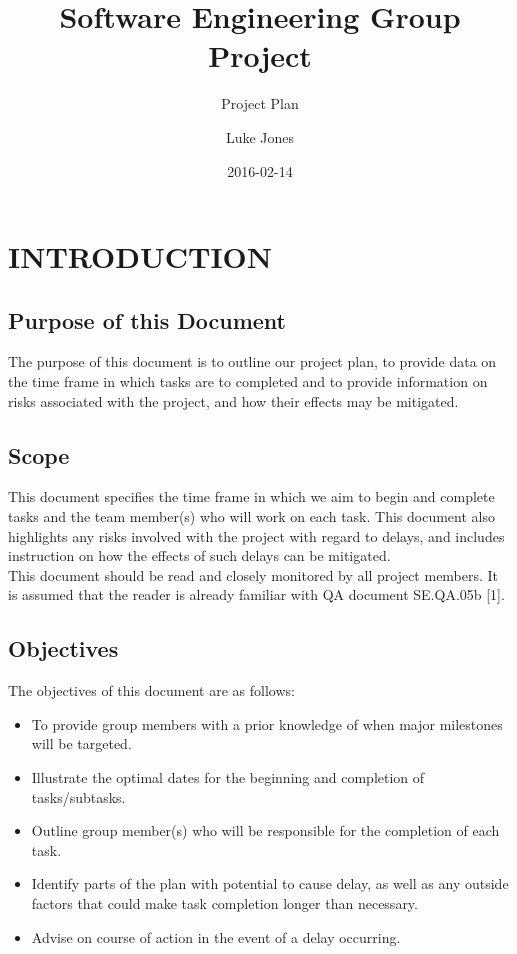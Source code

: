 \documentclass{project}
\begin{document}
\title{Software Engineering Group Project}
\subtitle{Project Plan}
\author{Luke Jones}     
\date{2016-02-14}
\maketitle
\tableofcontents
\newpage
\section{INTRODUCTION}
\subsection{Purpose of this Document}
The purpose of this document is to outline our project plan, to provide data on the time frame in which tasks are to completed and to provide information on risks associated with the project, and how their effects may be mitigated.
\subsection{Scope}
This document specifies the time frame in which we aim to begin and complete tasks and the team member(s) who will work on each task. This document also highlights any risks involved with the project with regard to delays, and includes instruction on how the effects of such delays can be mitigated.
\\[1\baselineskip]This document should be read and closely monitored by all project members. It is assumed that the reader is already familiar with QA document SE.QA.05b [1].
\subsection{Objectives}
The objectives of this document are as follows:
\begin {itemize}
	\item To provide group members with a prior knowledge of when major milestones will be targeted.
	\item Illustrate the optimal dates for the beginning and completion of tasks/subtasks.
	\item Outline group member(s) who will be responsible for the completion of each task.
	\item Identify parts of the plan with potential to cause delay, as well as any outside factors that could make task completion longer than necessary.
	\item Advise on course of action in the event of a delay occurring.
\end {itemize}	
\clearpage
\end{document}

